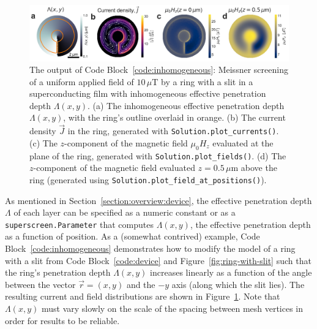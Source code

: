 \documentclass[final,3p,times,twocolumn]{elsarticle}
\newcommand{\inline}[1]{\texttt{#1}\xspace}
\newcommand{\um}{\mu\mathrm{m}}
\begin{document}
\begin{figure}
    \centering
    \includegraphics[width=\textwidth]{examples/images/ring_with_slit_inhomogeneous.pdf}
    \caption{The output of Code Block~\ref{code:inhomogeneous}: Meissner screening of a uniform applied field of $10\,\mu\mathrm{T}$ by a ring with a slit in a superconducting film with inhomogeneous effective penetration depth $\Lambda(x, y)$. (a) The inhomogeneous effective penetration depth $\Lambda(x, y)$, with the ring's outline overlaid in orange. (b) The current density $\vec{J}$ in the ring, generated with \inline{Solution.plot_currents()}. (c) The $z$-component of the magnetic field $\mu_0H_z$ evaluated at the plane of the ring, generated with \inline{Solution.plot_fields()}. (d) The $z$-component of the magnetic field evaluated $z=0.5\,\um$ above the ring (generated using \inline{Solution.plot_field_at_positions()}).}
    \label{fig:inhomogeneous}
\end{figure}

As mentioned in Section~\ref{section:overview:device}, the effective penetration depth $\Lambda$ of each layer can be specified as a numeric constant or as a \inline{superscreen.Parameter} that computes $\Lambda(x, y)$, the effective penetration depth as a function of position. As a (somewhat contrived) example, Code Block~\ref{code:inhomogeneous} demonstrates how to modify the model of a ring with a slit from Code Block~\ref{code:device} and Figure~\ref{fig:ring-with-slit} such that the ring's penetration depth $\Lambda(x, y)$ increases linearly as a function of the angle between the vector $\vec{r} = (x, y)$ and the $-y$ axis (along which the slit lies). The resulting current and field distributions are shown in Figure~\ref{fig:inhomogeneous}. Note that $\Lambda(x, y)$ must vary slowly on the scale of the spacing between mesh vertices in order for results to be reliable.
 
\end{document}
